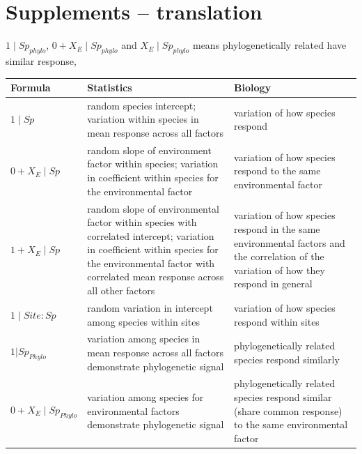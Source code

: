 \documentclass[12pt]{article}
\begin{document}
\newpage

\section*{Supplements -- translation}

$1 \mid Sp_{phylo}$, $0 + X_{E} \mid Sp_{phylo}$ and $X_{E} \mid Sp_{phylo}$ means phylogenetically related have similar response,   

\begin{tabularx}{\textwidth}{|l|X|X|}
\hline
Formula & Statistics & Biology \\
\hline
$1 \mid Sp$ &
random species intercept; variation within species in mean response across all factors &
variation of how species respond \\
\hline

$0 + X_{E} \mid Sp$ &
random slope of environment factor within species; variation in coefficient within species for the environmental factor &
variation of how species respond to the same environmental factor \\
\hline

$1 + X_{E} \mid Sp$ &
random slope of environmental factor within species with correlated intercept; variation in coefficient within species for the environmental factor with correlated mean response across all other factors &
variation of how species respond in the same environmental factors and the correlation of the variation of how they respond in general \\
\hline

$1 \mid Site:Sp $ &
random variation in intercept among species within sites &
variation of how species respond within sites \\
\hline

$1 | Sp_{Phylo} $ &
variation among species in mean response across all factors demonstrate phylogenetic signal &
phylogenetically related species respond similarly \\
\hline

$0 + X_{E} \mid Sp_{Phylo}$ &
variation among species for environmental factors demonstrate phylogenetic signal &
phylogenetically related species respond similar (share common response) to the same environmental factor \\
\hline
\end{tabularx}
            
            
            
            
            
                                                              



\end{document}
